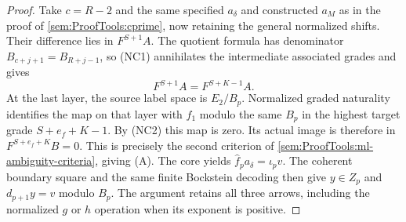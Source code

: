 \begin{proof}
Take $c=R-2$ and the same specified $a_\delta$ and constructed $a_M$
as in the proof of \ref{sem:ProofTools:cprime}, now retaining the general
normalized shifts. Their difference lies in $F^{S+1}A$.
The quotient formula has denominator $B_{c+j+1}=B_{R+j-1}$, so (NC1)
annihilates the intermediate associated grades and gives
\[
 F^{S+1}A=F^{S+K-1}A.
\]
At the last layer, the source label space is $E_2/B_p$.
Normalized graded naturality identifies the map on that layer with
$f_1$ modulo the same $B_p$ in the highest target grade
$S+e_f+K-1$. By (NC2) this map is zero. Its actual image is therefore
in $F^{S+e_f+K}B=0$. This is precisely the second criterion of
\ref{sem:ProofTools:ml-ambiguity-criteria}, giving (A).
The core yields $\widehat f_pa_\delta=\iota_pv$.
The coherent boundary square and the same finite Bockstein decoding
then give $y\in Z_p$ and $d_{p+1}y=v$ modulo $B_p$.
The argument retains all three arrows, including the normalized
$g$ or $h$ operation when its exponent is positive.
\end{proof}


